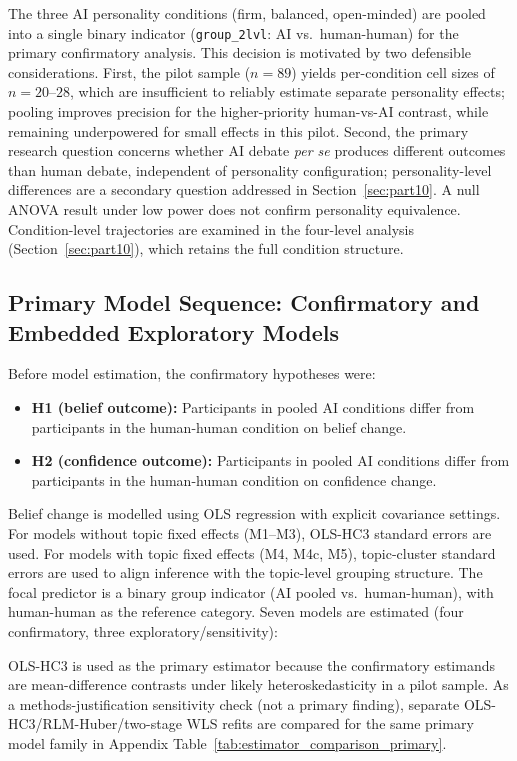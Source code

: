 The three AI personality conditions (firm, balanced, open-minded) are pooled
into a single binary indicator (\texttt{group\_2lvl}: AI vs.\ human-human)
for the primary confirmatory analysis. This decision is motivated by two
defensible considerations. First, the pilot sample ($n = 89$) yields per-condition
cell sizes of $n = 20$--$28$, which are insufficient to reliably estimate
separate personality effects; pooling improves precision for the
higher-priority human-vs-AI contrast, while remaining underpowered for
small effects in this pilot. Second, the primary research question
concerns whether AI debate \textit{per se} produces different outcomes than
human debate, independent of personality configuration; personality-level
differences are a secondary question addressed in Section~\ref{sec:part10}.
A null ANOVA result under low power does not confirm personality equivalence.
Condition-level trajectories are examined in the
four-level analysis (Section~\ref{sec:part10}), which retains the full
condition structure.


\subsection{Primary Model Sequence: Confirmatory and Embedded Exploratory Models}

Before model estimation, the confirmatory hypotheses were:
\begin{itemize}
    \item \textbf{H1 (belief outcome):} Participants in pooled AI conditions differ from
          participants in the human-human condition on belief change.
    \item \textbf{H2 (confidence outcome):} Participants in pooled AI conditions differ from
          participants in the human-human condition on confidence change.
\end{itemize}

Belief change is modelled using OLS regression with explicit covariance settings.
For models without topic fixed effects (M1--M3), OLS-HC3
standard errors are used. For models with topic fixed effects (M4, M4c, M5),
topic-cluster standard errors are used to align inference with the
topic-level grouping structure. The focal predictor is a binary group indicator
(AI pooled vs.\ human-human), with human-human as the reference category.
Seven models are estimated (four confirmatory, three exploratory/sensitivity):

OLS-HC3 is used as the primary estimator because the confirmatory estimands
are mean-difference contrasts under likely heteroskedasticity in a pilot sample.
As a methods-justification sensitivity
check (not a primary finding), separate OLS-HC3/RLM-Huber/two-stage WLS
refits are compared for the same primary model family in Appendix
Table~\ref{tab:estimator_comparison_primary}.

